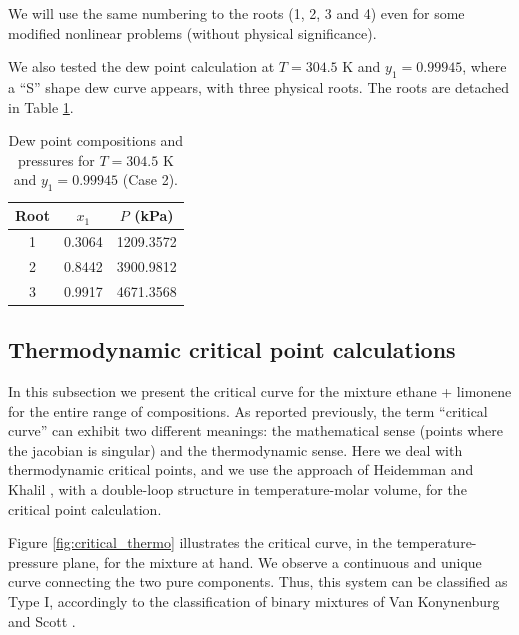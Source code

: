 \documentclass[journal=iecred,manuscript=article]{achemso}
\theoremstyle{definition}
\theoremstyle{remark}
\begin{document}
We will use the same numbering to the roots (1, 2, 3 and 4) even for some modified nonlinear problems (without physical significance).

We also tested the dew point calculation at $T = 304.5$ K and $y_1 = 0.99945$, where a \enquote{S} shape dew curve appears, with three physical roots. The roots are detached in Table \ref{tab:roots_S}.

\begin{table}[http!]
	\begin{center}
	\begin{tabular}{ccc} \hline \small
Root & $x_1$ & $P$ (kPa) \\
\hline
1 & 0.3064 & 1209.3572 \\
2 & 0.8442 & 3900.9812 \\
3 & 0.9917 & 4671.3568 \\
	\hline
	\end{tabular}
	\caption{ {\small Dew point compositions and pressures for $T = 304.5$ K and $y_1 = 0.99945$ (Case 2).}}\label{tab:roots_S}
	\end{center}
\end{table}
 
\subsection{Thermodynamic critical point calculations}

In this subsection we present the critical curve for the mixture ethane + limonene for the entire range of compositions. As reported previously, the term \enquote{critical curve} can exhibit two different meanings: the mathematical sense (points where the jacobian is 
singular) and the thermodynamic sense. Here we deal
 with thermodynamic critical points, and we use the approach of Heidemman and Khalil \citep{heidemman}, with a double-loop structure in temperature-molar volume, for the critical point calculation.

Figure \ref{fig:critical_thermo} illustrates the critical curve, in the temperature-pressure plane, for the mixture at hand. We observe a continuous and unique curve connecting the two pure components. Thus, this system can be classified as Type I, accordingly to the classification of binary mixtures of Van Konynenburg and Scott \cite{classif}.
\end{document}

